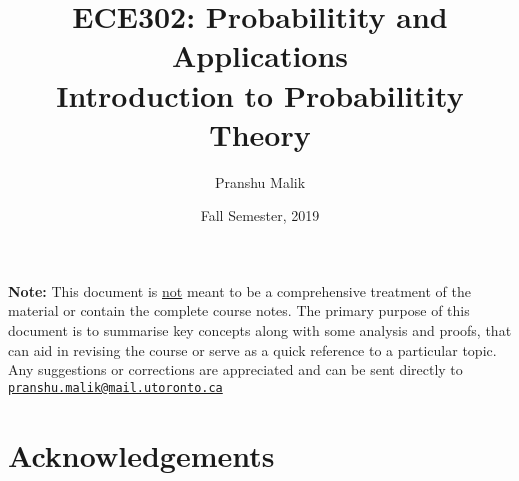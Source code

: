 \documentclass[10pt]{article}
\date{Fall Semester, 2019}
\begin{document}
\title{\textbf{\Large{\textsc{ECE302:} Probabilitity and Applications}} \\ \Large{Introduction to Probabilitity Theory} \vspace{-0.3cm}}
\author{Pranshu Malik}

\maketitle
\tableofcontents
\blfootnote
{
    \textbf{Note:} This document is \underline{not} meant to be a comprehensive treatment of the material 
    or contain the complete course notes. The primary purpose of this document is to summarise key concepts
    along with some analysis and proofs, that can aid in revising the course or serve as a quick reference 
    to a particular topic. Any suggestions or corrections are appreciated and can be
    sent directly to \texttt{\href{mailto:pranshu.malik@mail.utoronto.ca}{pranshu.malik@mail.utoronto.ca}}
}

\section{Acknowledgements}
\end{document}

